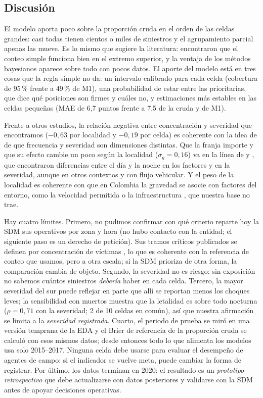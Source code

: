 \documentclass[10pt,twocolumn]{article}
\begin{document}
\subsection{Discusión}
El modelo aporta poco sobre la proporción cruda en el orden de las celdas grandes: casi todas tienen cientos o miles de siniestros y el agrupamiento parcial apenas las mueve. Es lo mismo que sugiere la literatura: \citet{lim2013identifying} encontraron que el conteo simple funciona bien en el extremo superior, y la ventaja de los métodos bayesianos aparece sobre todo con pocos datos. El aporte del modelo está en tres cosas que la regla simple no da: un intervalo calibrado para cada celda (cobertura de 95\,\% frente a 49\,\% de M1), una probabilidad de estar entre las prioritarias, que dice qué posiciones son firmes y cuáles no, y estimaciones más estables en las celdas pequeñas (MAE de 6,7 puntos frente a 7,5 de la cruda y de M1).

Frente a otros estudios, la relación negativa entre concentración y severidad que encontramos ($-0{,}63$ por localidad y $-0{,}19$ por celda) es coherente con la idea de \citet{stipancic2019network} de que frecuencia y severidad son dimensiones distintas. Que la franja importe y que su efecto cambie un poco según la localidad ($\sigma_g=0{,}16$) va en la línea de \citet{zeng2023bayesian} y \citet{zou2017truck}, que encontraron diferencias entre el día y la noche en los factores y en la severidad, aunque en otros contextos y con flujo vehicular. Y el peso de la localidad es coherente con que en Colombia la gravedad se asocie con factores del entorno, como la velocidad permitida o la infraestructura \citep{cantillo2020exploratory,vergel2020examining}, que nuestra base no trae.

Hay cuatro límites. Primero, no pudimos confirmar con qué criterio reparte hoy la SDM sus operativos por zona y hora (no hubo contacto con la entidad; el siguiente paso es un derecho de petición). Sus tramos críticos publicados se definen por concentración de víctimas \citep{sdm2026tramos}, lo que es coherente con la referencia de conteo que usamos, pero a otra escala; si la SDM prioriza de otra forma, la comparación cambia de objeto. Segundo, la severidad no es riesgo: sin exposición no sabemos cuántos siniestros \emph{debería} haber en cada celda. Tercero, la mayor severidad del sur puede reflejar en parte que allí se reportan menos los choques leves; la sensibilidad con muertos muestra que la letalidad es sobre todo nocturna ($\rho=0{,}71$ con la severidad; 2 de 10 celdas en común), así que nuestra afirmación se limita a la \emph{severidad registrada}. Cuarto, el periodo de prueba se miró en una versión temprana de la EDA y el Brier de referencia de la proporción cruda se calculó con esos mismos datos; desde entonces todo lo que alimenta los modelos usa solo 2015--2017. Ninguna celda debe usarse para evaluar el desempeño de agentes de campo: si el indicador se vuelve meta, puede cambiar la forma de registrar. Por último, los datos terminan en 2020: el resultado es un \emph{prototipo retrospectivo} que debe actualizarse con datos posteriores y validarse con la SDM antes de apoyar decisiones operativas.
\end{document}
